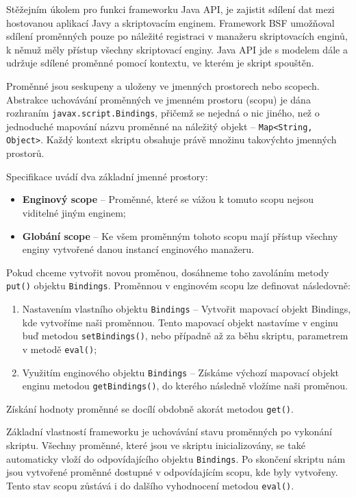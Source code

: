 Stěžejním úkolem pro funkci frameworku Java API, je zajistit sdílení dat mezi hostovanou aplikací Javy a skriptovacím enginem. Framework BSF umožňoval sdílení proměnných pouze po náležité registraci v manažeru skriptovacích enginů, k němuž měly přístup všechny skriptovací enginy. Java API jde s modelem dále a udržuje sdílené proměnné pomocí kontextu, ve kterém je skript spouštěn.

Proměnné jsou seskupeny a uloženy ve jmenných prostorech nebo scopech. Abstrakce uchovávání proměnných ve jmenném prostoru (scopu) je dána rozhraním \texttt{javax.script.Bindings}, přičemž se nejedná o nic jiného, než o jednoduché mapování názvu proměnné na náležitý objekt -- \texttt{Map<String, Object>}. Každý kontext skriptu obsahuje právě množinu takovýchto jmenných prostorů.

\bigskip \noindent Specifikace uvádí dva základní jmenné prostory:

\begin{itemize}
  \item \textbf{Enginový scope} -- Proměnné, které se vážou k tomuto scopu nejsou viditelné jiným enginem;
  \item \textbf{Globání scope} -- Ke všem proměnným tohoto scopu mají přístup všechny enginy vytvořené danou instancí enginového manažeru.
\end{itemize}

Pokud chceme vytvořit novou proměnou, dosáhneme toho zavoláním metody \texttt{put()} objektu \texttt{Bindings}. Proměnnou v enginovém scopu lze definovat následovně:

\begin{enumerate}
  \item Nastavením vlastního objektu \texttt{Bindings} -- Vytvořit mapovací objekt Bindings, kde vytvoříme naši proměnnou. Tento mapovací objekt nastavíme v enginu buď metodou \texttt{setBindings()}, nebo případně až za běhu skriptu, parametrem v metodě \texttt{eval()};
  \item Využitím enginového objektu \texttt{Bindings} -- Získáme výchozí mapovací objekt enginu metodou \texttt{getBindings()}, do kterého následně vložíme naši proměnou.
\end{enumerate}

Získání hodnoty proměnné se docílí obdobně akorát metodou \texttt{get()}.

Základní vlastností frameworku je uchovávání stavu proměnných po vykonání skriptu. Všechny proměnné, které jsou ve skriptu inicializovány, se také automaticky vloží do odpovídajícího objektu \texttt{Bindings}. Po skončení skriptu nám jsou vytvořené proměnné dostupné v odpovídajícím scopu, kde byly vytvořeny. Tento stav scopu zůstává i do dalšího vyhodnocení metodou \texttt{eval()}.

